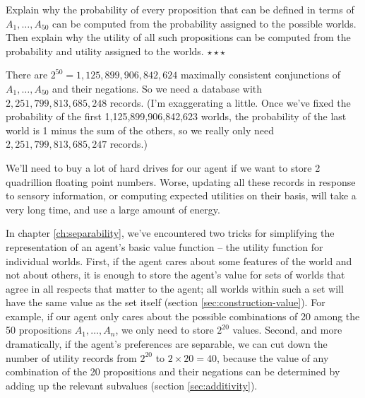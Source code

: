 \begin{exercise}
  Explain why the probability of every proposition that can be defined
  in terms of $A_1,\ldots,A_{50}$ can be computed from the probability
  assigned to the possible worlds. Then explain why the utility of all
  such propositions can be computed from the probability and utility
  assigned to the worlds. $\star\star\star$
\end{exercise}


There are $2^{50} = 1,125,899,906,842,624$ maximally consistent
conjunctions of $A_1,\ldots,A_{50}$ and their negations.  So we need a
database with $2,251,799,813,685,248$ records. (I'm exaggerating a
little. Once we've fixed the probability of the first
1,125,899,906,842,623 worlds, the probability of the last world is 1
minus the sum of the others, so we really only need
$2,251,799,813,685,247$ records.)

We'll need to buy a lot of hard drives for our agent if we want to
store 2 quadrillion floating point numbers. Worse, updating all these
records in response to sensory information, or computing expected
utilities on their basis, will take a very long time, and use a large
amount of energy.

In chapter \ref{ch:separability}, we've encountered two tricks for
simplifying the representation of an agent's basic value function --
the utility function for individual worlds. First, if the agent cares
about some features of the world and not about others, it is enough to
store the agent's value for sets of worlds that agree in all respects
that matter to the agent; all worlds within such a set will have the
same value as the set itself (section
\ref{sec:construction-value}). For example, if our agent only cares
about the possible combinations of 20 among the 50 propositions
$A_1,\ldots,A_n$, we only need to store $2^{20}$ values. Second, and
more dramatically, if the agent's preferences are separable, we can
cut down the number of utility records from $2^{20}$ to $2 \times 20 =
40$, because the value of any combination of the 20 propositions and
their negations can be determined by adding up the relevant subvalues
(section \ref{sec:additivity}).

